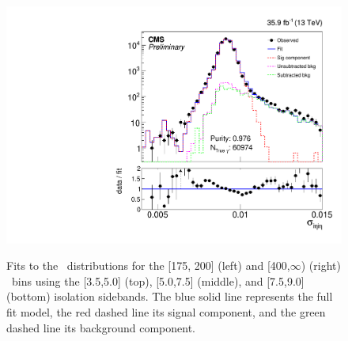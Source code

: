 \begin{figure}[htbp]
{    \includegraphics[]{Analysis/Figures/pvsf/ssfit_400_medium_nominal_logy.pdf}
  }
  \caption{
    Fits to the \sieie\ distributions for the [175, 200] (left) and [400,$\infty$) (right) \pt\ bins using the [3.5,5.0] (top), [5.0,7.5] (middle), and [7.5,9.0] (bottom) isolation sidebands.
      The blue solid line represents the full fit model, the red dashed line its signal component, and the green dashed line its background component.
    }
    \label{fig:impurity-sideband}
\end{figure}
